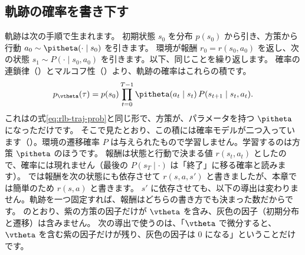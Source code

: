\subsection*{軌跡の確率を書き下す}

軌跡は次の手順で生まれます。
初期状態 $s_0$ を分布 $p(s_0)$ から引き、方策から行動 $a_0\sim\pitheta(\cdot\mid s_0)$ を引きます。
環境が報酬 $r_0=r(s_0,a_0)$ を返し、次の状態 $s_1\sim P(\cdot\mid s_0,a_0)$ を引きます。以下、同じことを繰り返します。
確率の連鎖律（）とマルコフ性（）より、軌跡の確率はこれらの積です。
\begin{equation}
p_{\vtheta}(\tau)=p(s_0)\prod_{t=0}^{T-1}\pitheta(a_t\mid s_t)\,P(s_{t+1}\mid s_t,a_t).
\label{eq:pg-traj-prob}
\end{equation}
これはの式\eqref{eq:rlb-traj-prob}と同じ形で、方策が、パラメータを持つ $\pitheta$ になっただけです。
そこで見たとおり、この積には確率モデルが二つ入っています（）。環境の遷移確率 $P$ は与えられたもので学習しません。学習するのは方策 $\pitheta$ のほうです。
報酬は状態と行動で決まる値 $r(s_t,a_t)$ としたので、確率には現れません（最後の $P(s_T\mid\cdot)$ は「終了」に移る確率と読みます）。
では報酬を次の状態にも依存させて $r(s,a,s')$ と書きましたが、本章では簡単のため $r(s,a)$ と書きます。
$s'$ に依存させても、以下の導出は変わりません。軌跡を一つ固定すれば、報酬はどちらの書き方でも決まった数だからです。
のとおり、紫の方策の因子だけが $\vtheta$ を含み、灰色の因子（初期分布と遷移）は含みません。
次の導出で使うのは、「$\vtheta$ で微分すると、$\vtheta$ を含む紫の因子だけが残り、灰色の因子は 0 になる」ということだけです。

